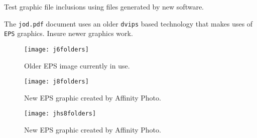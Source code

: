 %
%
%




Test graphic file inclusions using files generated by new software.

The \texttt{jod.pdf} document uses an older \texttt{dvips} based technology
that makes uses of \texttt{EPS} graphics.  Insure newer graphics work.


\begin{figure}
\centering
 \texttt{[image: j6folders]}
 \caption{Older EPS image currently in use.}
\end{figure}


\begin{figure}
  \centering
  \texttt{[image: j8folders]}
  \caption{New EPS graphic created by Affinity Photo.}
\end{figure}


\begin{figure}
  \centering
  \texttt{[image: jhs8folders]}
  \caption{New EPS graphic created by Affinity Photo.}
\end{figure}
  


